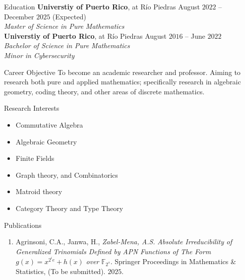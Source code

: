 \documentclass{resume}
\begin{document}
\begin{rSection}{Education}
  \textbf{Universtiy of Puerto Rico}, at R\'io Piedras
  \hfill August $2022$ -- December $2025$ (Expected)  \\
  \textit{Master of Science in Pure Mathematics} \\

  \textbf{Universtiy of Puerto Rico}, at R\'io Piedras
  \hfill August $2016$ -- June $2022$  \\
  \textit{Bachelor of Science in Pure Mathematics}  \\
  \textit{Minor in Cybersecurity}
\end{rSection}

\begin{rSection}{Career Objective}
  To become an academic researcher and professor. Aiming to research both pure
  and applied mathematics; specifically research in algebraic
  geometry, coding theory, and other areas of discrete mathematics.
\end{rSection}

\begin{rSection}{Research Interests}
  \begin{multicols}{2}
    \begin{itemize}
      \item Commutative Algebra

      \item Algebraic Geometry

      \item Finite Fields

      \item Graph theory, and Combinatorics

      \item Matroid theory

      \item Category Theory and Type Theory
    \end{itemize}
  \end{multicols}
\end{rSection}


\begin{rSection}{Publications}
  \begin{enumerate}
    \item Agrinsoni, C.A., Janwa, H., \textit{Zabel-Mena, A.S.}
      \textit{Absolute Irreducibility of Generalized
        Trinomials Defined by APN Functions of The Form
      $g(x)=x^{2^ie}+h(x)$ over $\mathbb{F}_{2^s}$}. Springer
      Proceedings in Mathematics \& Statistics, (To be submitted).
      $2025$.
  \end{enumerate}
\end{rSection}
\end{document}
